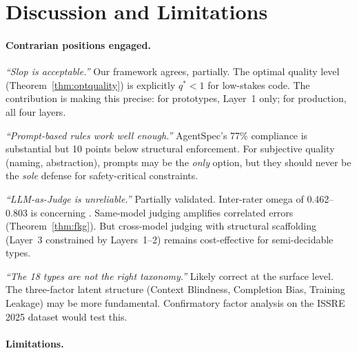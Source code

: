 \documentclass[11pt, a4paper]{article}
\theoremstyle{definition}
\theoremstyle{remark}
\begin{document}
\section{Discussion and Limitations}
\label{sec:discussion}

\paragraph{Contrarian positions engaged.}

\emph{``Slop is acceptable.''} Our framework agrees, partially. The optimal quality level (Theorem~\ref{thm:optquality}) is explicitly $q^* < 1$ for low-stakes code. The contribution is making this precise: for prototypes, Layer~1 only; for production, all four layers.

\emph{``Prompt-based rules work well enough.''} AgentSpec's 77\% compliance is substantial but 10 points below structural enforcement. For subjective quality (naming, abstraction), prompts may be the \emph{only} option, but they should never be the \emph{sole} defense for safety-critical constraints.

\emph{``LLM-as-Judge is unreliable.''} Partially validated. Inter-rater omega of 0.462--0.803 is concerning \citep{llmjudgetrust2024}. Same-model judging amplifies correlated errors (Theorem~\ref{thm:fkg}). But cross-model judging with structural scaffolding (Layer~3 constrained by Layers~1--2) remains cost-effective for semi-decidable types.

\emph{``The 18 types are not the right taxonomy.''} Likely correct at the surface level. The three-factor latent structure (Context Blindness, Completion Bias, Training Leakage) may be more fundamental. Confirmatory factor analysis on the ISSRE 2025 dataset would test this.

\paragraph{Limitations.}
\end{document}
